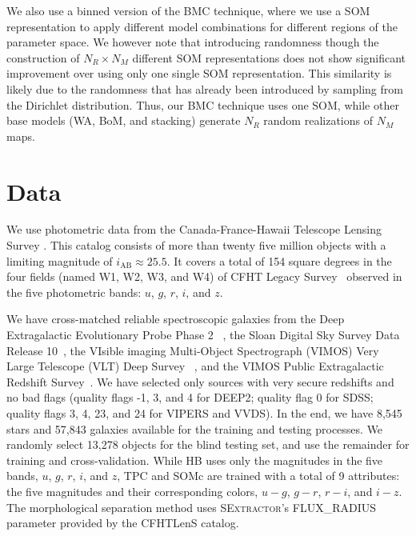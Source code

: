 We also use a binned version of the BMC technique,
where we use a SOM representation
to apply different model combinations
for different regions of the parameter space.
We however note that introducing randomness
though the construction of $N_R \times N_M$ different SOM representations
does not show significant
improvement over using only one single SOM representation.
This similarity is likely due to the randomness 
that has already been introduced by 
sampling from the Dirichlet distribution.
Thus, our BMC technique uses one SOM,
while other base models (WA, BoM, and stacking)
generate $N_R$ random realizations of $N_M$ maps.


\section{Data}
  \label{section:data}

We use photometric data from
the Canada-France-Hawaii Telescope Lensing Survey \cite[CFHTLenS;][]
{heymans2012cfhtlens,erben2013cfhtlens,hildebrandt2012cfhtlens}.
This catalog consists of more than twenty five million objects
with a limiting magnitude of $i_{\text{AB}} \approx 25.5$. 
It covers a total of 154 square degrees
in the four fields (named W1, W2, W3, and W4)
of CFHT Legacy Survey~\citep[CFHTLS;][]{gwyn2012canada}
observed in the five photometric bands:
$u$, $g$, $r$, $i$, and $z$.

We have cross-matched reliable spectroscopic galaxies from
the Deep Extragalactic Evolutionary Probe Phase 2~
\citep[DEEP2;][]{davis2003science,newman2013deep2},
the Sloan Digital Sky Survey Data Release 10~\citep[SDSS-DR10]{Ahn2014},
the VIsible imaging Multi-Object Spectrograph (VIMOS)
Very Large Telescope (VLT) Deep Survey~
\citep[VVDS;][]{le2005vimos,garilli2008vimos}, and
the VIMOS Public Extragalactic Redshift
Survey~\citep[VIPERS;][]{garilli2014vimos}.
We have selected only sources with very secure
redshifts and no bad flags (quality flags -1, 3, and 4 for DEEP2;
quality flag 0 for SDSS; quality flags 3, 4, 23, and 24 for VIPERS
and VVDS).
In the end, we have 8,545 stars and 57,843 galaxies available
for the training and testing processes.
We randomly select 13,278 objects for the blind testing set,
and use the remainder for training and cross-validation.
While HB uses only the magnitudes in the five bands,
$u$, $g$, $r$, $i$, and $z$,
TPC and SOMc are trained with a total of 9 attributes: the five magnitudes
and their corresponding colors, $u-g$, $g-r$, $r-i$, and $i-z$.
The morphological separation method uses \textsc{SExtractor}'s 
FLUX\_RADIUS parameter provided by the CFHTLenS catalog.

